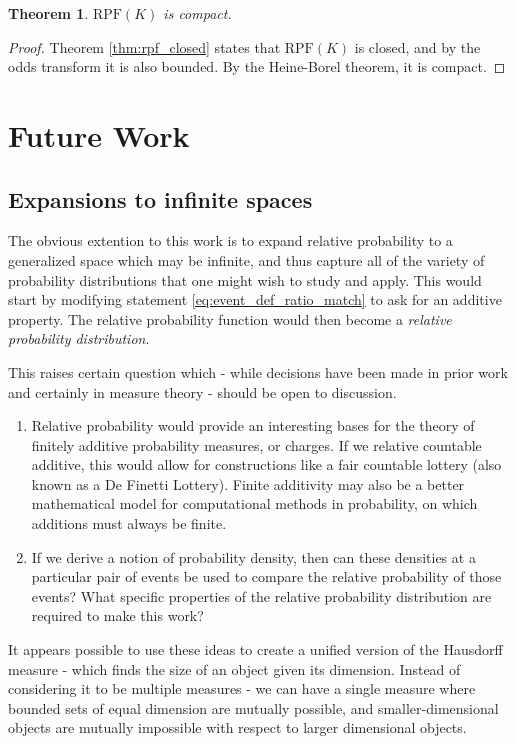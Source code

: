 \documentclass[twoside]{article}
\theoremstyle{plain}%
\newtheorem{theorem}{Theorem}[section]
\theoremstyle{definition}
\theoremstyle{remark}
\begin{document}
\begin{theorem}
\(\text{RPF}(K)\) is compact.
\end{theorem}

\begin{proof}
Theorem \ref{thm:rpf_closed} states that \(\text{RPF}(K)\) is closed, and by the odds transform it is also bounded. By the Heine-Borel theorem, it is compact.
\end{proof}

\section{Future Work}
\label{section:future_work}
\subsection{Expansions to infinite spaces}
The obvious extention to this work is to expand relative probability to a generalized space which may be infinite, and thus capture all of the variety of probability distributions that one might wish to study and apply. This would start by modifying statement \ref{eq:event_def_ratio_match} to ask for an additive property. The relative probability function would then become a \textit{relative probability distribution}.

This raises certain question which - while decisions have been made in prior work and certainly in measure theory - should be open to discussion.
\begin{enumerate}
\item Relative probability would provide an interesting bases for the theory of finitely additive probability measures, or charges\cite{charge}. If we relative countable additive, this would allow for constructions like a fair countable lottery (also known as a De Finetti Lottery\cite{de_finetti}). Finite additivity may also be a better mathematical model for computational methods in probability, on which additions must always be finite.
\item If we derive a notion of probability density, then can these densities at a particular pair of events be used to compare the relative probability of those events? What specific properties of the relative probability distribution are required to make this work?
\end{enumerate}

It appears possible to use these ideas to create a unified version of the Hausdorff measure - which finds the size of an object given its dimension. Instead of considering it to be multiple measures - we can have a single measure where bounded sets of equal dimension are mutually possible, and smaller-dimensional objects are mutually impossible with respect to larger dimensional objects.
\end{document}
